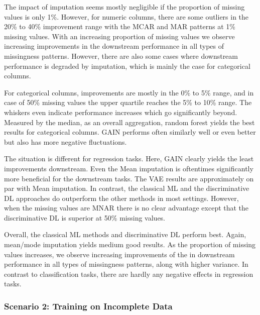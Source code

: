 The impact of imputation seems mostly negligible if the proportion of missing values is only 1\%. However, for numeric columns, there are some outliers in the 20\% to 40\% improvement range with the MCAR and MAR patterns at 1\% missing values. With an increasing proportion of missing values we observe increasing improvements in the downstream performance in all types of missingness patterns. However, there are also some cases where downstream performance is degraded by imputation, which is mainly the case for categorical columns. 

For categorical columns, improvements are mostly in the 0\% to 5\% range, and in case of 50\% missing values the upper quartile reaches the 5\% to 10\% range. The whiskers even indicate performance increases which go significantly beyond. Measured by the median, as an overall aggregation, random forest yields the best results for categorical columns. GAIN performs often similarly well or even better but also has more negative fluctuations.

The situation is different for regression tasks. Here, GAIN clearly yields the least improvements downstream. Even the Mean imputation is oftentimes significantly more beneficial for the downstream tasks. The VAE results are approximately on par with Mean imputation. In contrast, the classical ML and the discriminative DL approaches do outperform the other methods in most settings. However, when the missing values are MNAR there is no clear advantage except that the discriminative DL is superior at 50\% missing values.

Overall, the classical ML methods and discriminative DL perform best. Again, mean/mode imputation yields medium good results. As the proportion of missing values increases, we observe increasing improvements of the in downstream performance in all types of missingness patterns, along with higher variance. In contrast to classification tasks, there are hardly any negative effects in regression tasks.


\subsubsection{Scenario 2: Training on Incomplete Data}

